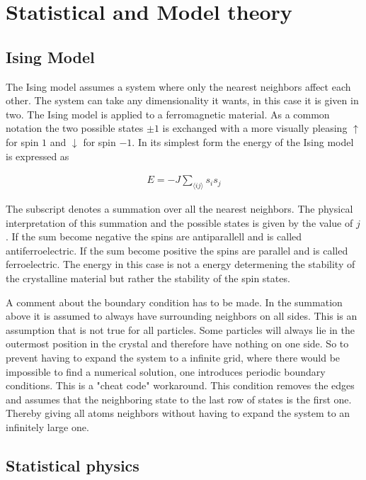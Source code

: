 
\section{Statistical and Model theory}
\subsection{Ising Model}
The Ising model assumes a system where only the nearest neighbors affect each other. The system can take any dimensionality it wants, in this case it is given in two. The Ising model is applied to a ferromagnetic material. As a common notation the two possible states $\pm1$ is exchanged with a more visually pleasing $\uparrow$ for spin $1$ and $\downarrow$ for spin $-1$. In its simplest form the energy of the Ising model is expressed as 

\begin{align}
	E=-J\sum_{\langle ij\rangle} s_is_j\label{energy}
\end{align}

The subscript denotes a summation over all the nearest neighbors. The physical interpretation of this summation and the possible states is given by the value of $j$. If the sum become negative the spins are antiparallell and is called antiferroelectric. If the sum become positive the spins are parallel and is called ferroelectric. The energy in this case is not a energy determening the stability of the crystalline material but rather the stability of the spin states\cite{ferromagnetism}.


A comment about the boundary condition has to be made. In the summation above it is assumed to always have surrounding neighbors on all sides. This is an assumption that is not true for all particles. Some particles will always lie in the outermost position in the crystal and therefore have nothing on one side. So to prevent having to expand the system to a infinite grid, where there would be impossible to find a numerical solution, one introduces periodic boundary conditions. This is a "cheat code" workaround. This condition removes the edges and assumes that the neighboring state to the last row of states is the first one. Thereby giving all atoms neighbors without having to expand the system to an infinitely large one.






\subsection{Statistical physics}

